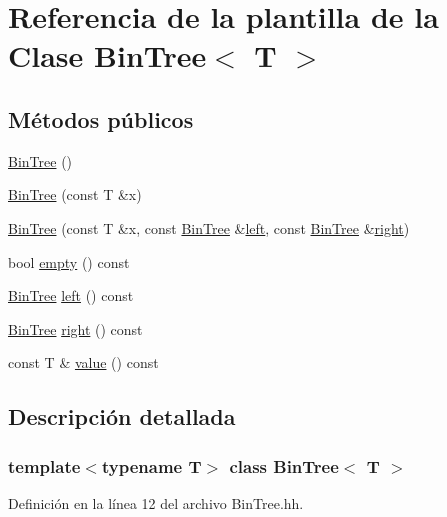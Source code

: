 \hypertarget{class_bin_tree}{}\section{Referencia de la plantilla de la Clase Bin\+Tree$<$ T $>$}
\label{class_bin_tree}
\subsection*{Métodos públicos}
\begin{DoxyCompactItemize}
\item 
\mbox{\hyperlink{class_bin_tree_a47eef22d29cd023449d97c073c08e5b6}{Bin\+Tree}} ()
\item 
\mbox{\hyperlink{class_bin_tree_a1ab686e0bcf990093ff91fe71744c1a4}{Bin\+Tree}} (const T \&x)
\item 
\mbox{\hyperlink{class_bin_tree_adb7eeff76d08130c943b36af215eb521}{Bin\+Tree}} (const T \&x, const \mbox{\hyperlink{class_bin_tree}{Bin\+Tree}} \&\mbox{\hyperlink{class_bin_tree_a82108db4c1b08d1f111027788c196d4e}{left}}, const \mbox{\hyperlink{class_bin_tree}{Bin\+Tree}} \&\mbox{\hyperlink{class_bin_tree_aff8e96651b27284c329667b5ad3e4d0b}{right}})
\item 
bool \mbox{\hyperlink{class_bin_tree_a74cda259ba5c25b8ee38ed4dc33e4fad}{empty}} () const
\item 
\mbox{\hyperlink{class_bin_tree}{Bin\+Tree}} \mbox{\hyperlink{class_bin_tree_a82108db4c1b08d1f111027788c196d4e}{left}} () const
\item 
\mbox{\hyperlink{class_bin_tree}{Bin\+Tree}} \mbox{\hyperlink{class_bin_tree_aff8e96651b27284c329667b5ad3e4d0b}{right}} () const
\item 
const T \& \mbox{\hyperlink{class_bin_tree_a734e785b089c87b49187ee7c58edf5f3}{value}} () const
\end{DoxyCompactItemize}


\subsection{Descripción detallada}
\subsubsection*{template$<$typename T$>$\newline
class Bin\+Tree$<$ T $>$}



Definición en la línea 12 del archivo Bin\+Tree.\+hh.



